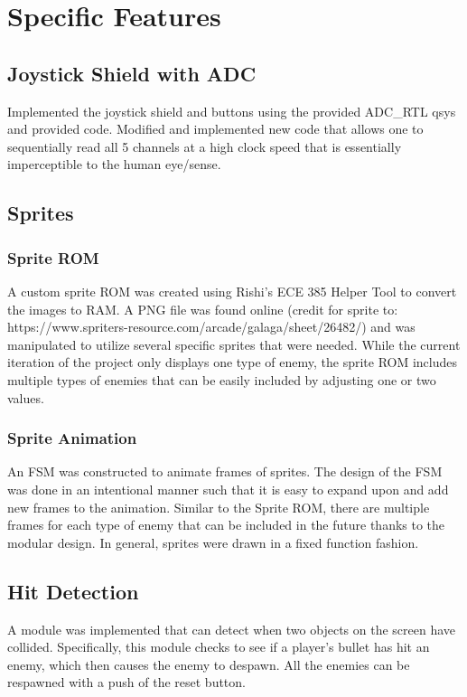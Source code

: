 \section{Specific Features}
\subsection{Joystick Shield with ADC}

\quad Implemented the joystick shield and buttons using the provided ADC\_RTL qsys and provided code. Modified and implemented new code that allows one to sequentially read all 5 channels at a high clock speed that is essentially imperceptible to the human eye/sense.


\subsection{Sprites}
\subsubsection{Sprite ROM}

\quad A custom sprite ROM was created using Rishi's ECE 385 Helper Tool to convert the images to RAM. A PNG file was found online (credit for sprite to: https://www.spriters-resource.com/arcade/galaga/sheet/26482/) and was manipulated to utilize several specific sprites that were needed. While the current iteration of the project only displays one type of enemy, the sprite ROM includes multiple types of enemies that can be easily included by adjusting one or two values.



\subsubsection{Sprite Animation}

\quad An FSM was constructed to animate frames of sprites. The design of the FSM was done in an intentional manner such that it is easy to expand upon and add new frames to the animation. Similar to the Sprite ROM, there are multiple frames for each type of enemy that can be included in the future thanks to the modular design. In general, sprites were drawn in a fixed function fashion.


\subsection{Hit Detection}

\quad A module was implemented that can detect when two objects on the screen have collided. Specifically, this module checks to see if a player's bullet has hit an enemy, which then causes the enemy to despawn. All the enemies can be respawned with a push of the reset button.

